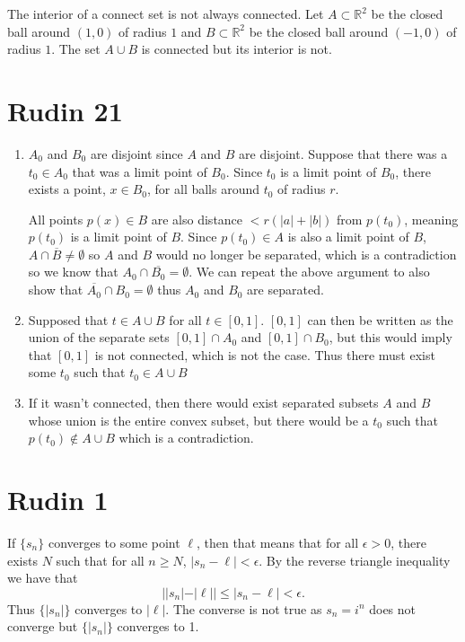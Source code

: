 \documentclass{article}
\begin{document}
The interior of a connect set is not always connected.
Let $A \subset \mathbb{R}^2$ be the closed ball around $(1,0)$ of radius $1$ 
and $B \subset \mathbb{R}^2$ be the closed ball around $(-1,0)$ of radius $1$.
The set $A \cup B$ is connected but its interior is not.
\newpage 

\section*{Rudin 21}
\begin{enumerate}
	\item $A_0$ and $B_0$ are disjoint since $A$ and $B$ are disjoint.
	Suppose that there was a $t_0 \in A_0$ that was a limit point of $B_0$.
	Since $t_0$ is a limit point of $B_0$, 
	there exists a point, $x \in B_0$, for all
	balls around $t_0$ of radius $r$.

	All points $p(x) \in B$ are also
	distance $<r(|a| + |b|)$ from $p(t_0)$, meaning $p(t_0)$ is a limit point of $B$.
	Since $p(t_0) \in A$ is also a limit point of $B$, 
	$A \cap \overline{B} \neq \emptyset$ so $A$ and $B$ would no longer be separated,
	which is a contradiction so we know that $A_0 \cap \overline{B_0} = \emptyset$.
	We can repeat the above argument to also show that
	$\overline{A_0} \cap B_0 = \emptyset$ thus $A_0$ and $B_0$ are separated.
	
	\item Supposed that $t \in A \cup B$ for all $t \in [0,1]$.
	$[0,1]$ can then be written as the union of the separate sets $[0,1] \cap A_0$
	and $[0,1] \cap B_0$, but this would imply that $[0,1]$ is not connected, which is 
	not the case. Thus there must exist some $t_0$ such that $t_0 \in A \cup B$
	\item If it wasn't connected, then there would exist
	 separated subsets $A$ and $B$ whose union is the entire convex subset,
	but there would be a $t_0$ such that  $p(t_0) \not\in A \cup B$
	which is a contradiction.
\end{enumerate}
\newpage

\section*{Rudin 1}
If $\{s_n\}$ converges to some point $\ell$, then that means that
for all $\epsilon > 0$, there exists $N$ such that for all $n \geq N$,
$|s_n - \ell| < \epsilon$.
By the reverse triangle inequality we have that 
\[
	 ||s_n| - |\ell|| \leq |s_n - \ell| < \epsilon.
\]
Thus $\{|s_n|\}$ converges to $|\ell|$.
The converse is not true as $s_n = i^n$ does not converge but 
$\{|s_n|\}$ converges to 1.
\newpage 
\end{document}
